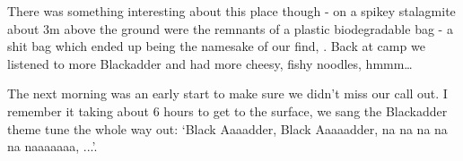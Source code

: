There was something interesting about this place though - on a spikey stalagmite about 3m above the ground were the remnants of a plastic biodegradable bag - a shit bag which ended up being the namesake of our find, . Back at camp we listened to more Blackadder and had more cheesy, fishy noodles, hmmm…

The next morning was an early start to make sure we didn’t miss our call out. I remember it taking about 6 hours to get to the surface, we sang the Blackadder theme tune the whole way out: `Black Aaaadder, Black Aaaaadder, na na na na na naaaaaaa, ...'.


